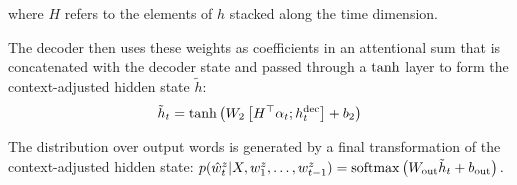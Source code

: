where $H$ refers to the elements of $h$ stacked along the time dimension.

The decoder then uses these weights as coefficients in an attentional sum
that is concatenated with the decoder state 
and passed through a $\rm tanh$ layer
to form the context-adjusted hidden state $\tilde{h}$:
\begin{equation}
\tilde h_{t} = {\rm tanh} \left( W_2 \left[ H^\top \alpha_t ; h^{\rm dec}_{t} \right ] + b_2 \right)
\end{equation}

The distribution over output words is generated by a final transformation of the context-adjusted hidden state:
$
p(\hat{w}^z_t|X,w^z_1,\ldots,w^z_{t-1}) = {\rm softmax} \left( W_{\rm out} \tilde h_t + b_{\rm out} \right).
$